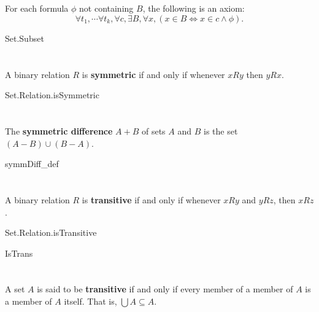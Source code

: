 \documentclass{report}
\begin{document}
\section{}%

  For each formula $\phi$ not containing $B$, the following is an axiom:
    $$\forall t_1, \cdots \forall t_k, \forall c,
        \exists B, \forall x, (x \in B \iff x \in c \land \phi).$$

    {Set.Subset}

\section{}%

  A binary relation $R$ is \textbf{symmetric} if and only if whenever $xRy$ then
    $yRx$.

    {Set.Relation.isSymmetric}

\section{}%

  The \textbf{symmetric difference} $A + B$ of sets $A$ and $B$ is the set
    $(A - B) \cup (B - A)$.

    {symmDiff\_def}

\section{}%

  A binary relation $R$ is \textbf{transitive} if and only if whenever $xRy$ and
    $yRz$, then $xRz$.

    {Set.Relation.isTransitive}

    {IsTrans}

\section{}%

  A set $A$ is said to be \textbf{transitive} if and only if every member of a
    member of $A$ is a member of $A$ itself.
  That is, $\bigcup A \subseteq A$.
\end{document}
